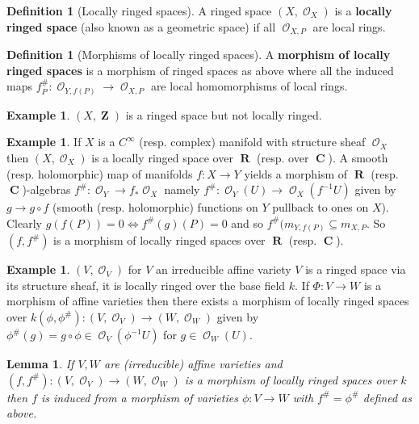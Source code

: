 \documentclass[10pt,]{book}
\newcommand{\terminology}[1]{\textbf{#1}}
\theoremstyle{plain}
\newtheorem{lemma}[theorem]{Lemma}
\theoremstyle{definition}
\newtheorem{definition}[theorem]{Definition}
\newtheorem{example}[theorem]{Example}
\DeclareMathOperator{\CC}{\mathbf{C}}
\DeclareMathOperator{\RR}{\mathbf{R}}
\DeclareMathOperator{\ZZ}{\mathbf{Z}}
\DeclareMathOperator{\cO}{\mathcal{O}}
\begin{document}
\begin{definition}[Locally ringed spaces]\label{definition-11}
A ringed space \((X, \cO_X)\) is a \terminology{locally ringed space} (also known as a geometric space) if all \(\cO_{X,P}\) are local rings.\end{definition}
\begin{definition}[Morphisms of locally ringed spaces]\label{definition-12}
A \terminology{morphism of locally ringed spaces} is a morphism of ringed spaces as above where all the induced maps \(f_P^\#\colon \cO_{Y,f(P)} \to \cO_{X,P}\) are local homomorphisms of local rings.\end{definition}
\begin{example}\label{example-7}
\((X,\ZZ)\) is a ringed space but not locally ringed.\end{example}
\begin{example}\label{example-8}
If \(X\) is a \(C^\infty\) (resp. complex) manifold with structure sheaf \(\cO_X\) then \((X, \cO_X)\) is a locally ringed space over \(\RR\) (resp. over \(\CC\)).
            A smooth (resp. holomorphic) map of manifolds \(f\colon X\to Y\) yields a morphism of \(\RR\) (resp. \(\CC\))-algebras \(f^\#\colon \cO_Y\to f_* \cO_X\) namely \(f^\#\colon\cO_Y(U) \to\cO_X(f^{-1}U)\) given by \(g\to g\circ f\) (smooth (resp. holomorphic) functions on \(Y\) pullback to ones on \(X\)).
            Clearly \(g(f(P)) = 0 \iff f^\#(g)(P) = 0\) and so \(f^\#(m_{Y,f(P)} \subseteq m_{X,P}\).
            So \((f,f^\#)\) is a morphism of locally ringed spaces over \(\RR\) (resp. \(\CC\)).
          \end{example}
\begin{example}\label{example-9}
\((V,\cO_V)\) for \(V\) an irreducible affine variety \(V\) is a ringed space via its structure sheaf, it is locally ringed over the base field \(k\).
            If \(\Phi\colon V \to W\) is a morphism of affine varieties then there exists a morphism of locally ringed spaces over \(k\)\((\phi, \phi^\#)\colon (V, \cO_V) \to (W, \cO_W)\) given by \(\phi^\#(g) = g\circ \phi \in \cO_V(\phi^{-1}U)\) for \(g\in\cO_W(U)\).
          \end{example}
\begin{lemma}\label{lemma-2}
If \(V,W\) are (irreducible) affine varieties and \((f,f^\#)\colon (V,\cO_V)\to (W,\cO_W)\) is a morphism of locally ringed spaces over \(k\) then \(f\) is induced from a morphism of varieties \(\phi\colon V\to W\) with \(f^\# = \phi^\#\) defined as above.\end{lemma}
\end{document}
